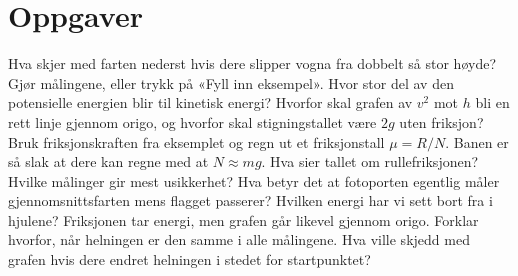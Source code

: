 \documentclass[11pt]{article}
\begin{document}
\section*{Oppgaver}

\begin{oppgaveliste}
\oppgave {}Hva skjer med farten nederst hvis dere slipper vogna fra dobbelt så stor høyde?
\svar
\oppgave {}Gjør målingene, eller trykk på «Fyll inn eksempel». Hvor stor del av den potensielle energien blir til kinetisk energi?
\svar
\oppgave {}Hvorfor skal grafen av $v^{2}$ mot $h$ bli en rett linje gjennom origo, og hvorfor skal stigningstallet være $2g$ uten friksjon?
\svar
\oppgave {}Bruk friksjonskraften fra eksemplet og regn ut et friksjonstall $μ = R/N$. Banen er så slak at dere kan regne med at $N \approx mg$. Hva sier tallet om rullefriksjonen?
\svar
\oppgave {}Hvilke målinger gir mest usikkerhet? Hva betyr det at fotoporten egentlig måler gjennomsnittsfarten mens flagget passerer? Hvilken energi har vi sett bort fra i hjulene?
\svar
\oppgave {}Friksjonen tar energi, men grafen går likevel gjennom origo. Forklar hvorfor, når helningen er den samme i alle målingene. Hva ville skjedd med grafen hvis dere endret helningen i stedet for startpunktet?
\svar
\end{oppgaveliste}
\end{document}
